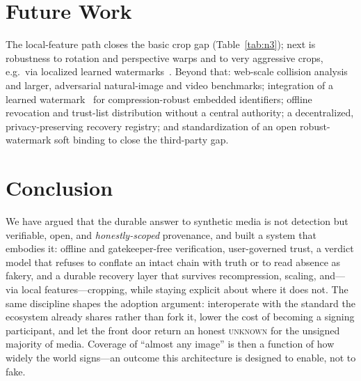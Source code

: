 \documentclass[11pt]{article}
\newcommand{\state}[1]{\textsc{#1}}
\begin{document}
\section{Future Work}\label{sec:future}
The local-feature path closes the basic crop gap (Table~\ref{tab:n3}); next is robustness to
rotation and perspective warps and to very aggressive crops, e.g.\ via localized learned
watermarks~\cite{sander2024wam}. Beyond that: web-scale collision analysis and larger,
adversarial natural-image and video benchmarks; integration of a learned
watermark~\cite{bui2023trustmark} for compression-robust embedded identifiers; offline
revocation and trust-list distribution without a central authority; a decentralized,
privacy-preserving recovery registry; and standardization of an open robust-watermark soft
binding to close the third-party gap.

\section{Conclusion}
We have argued that the durable answer to synthetic media is not detection but verifiable,
open, and \emph{honestly-scoped} provenance, and built a system that embodies it: offline and
gatekeeper-free verification, user-governed trust, a verdict model that refuses to conflate an
intact chain with truth or to read absence as fakery, and a durable recovery layer that
survives recompression, scaling, and---via local features---cropping, while staying explicit
about where it does not. The same discipline shapes the adoption argument: interoperate with
the standard the ecosystem already shares rather than fork it, lower the cost of becoming a
signing participant, and let the front door return an honest \state{unknown} for the unsigned
majority of media. Coverage of ``almost any image'' is then a function of how widely the world
signs---an outcome this architecture is designed to enable, not to fake.



\end{document}
